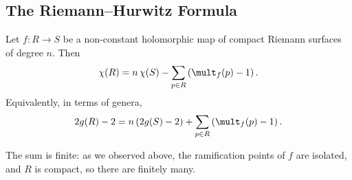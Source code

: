 \subsection{The Riemann--Hurwitz Formula}

\begin{theorem}\label{rs-thm:RH}
	Let $f : R \to S$ be a non-constant holomorphic map of compact Riemann surfaces of
	degree $n$. Then
	$$
	\chi(R) = n\,\chi(S) - \sum_{p \in R}\left(\mult_f(p) - 1\right).
	$$
	Equivalently, in terms of genera,
	$$
	2g(R) - 2 = n\left(2g(S) - 2\right) + \sum_{p\in R}\left(\mult_f(p)-1\right).
	$$
\end{theorem}

The sum is finite: as we observed above, the ramification points of $f$ are isolated, and
$R$ is compact, so there are finitely many.

